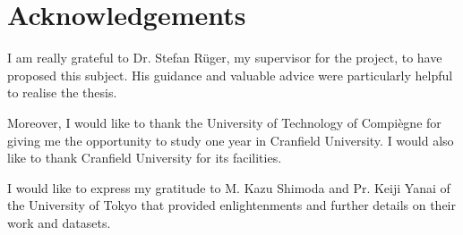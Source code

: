 \chapter{Acknowledgements}

I am really grateful to Dr. Stefan Rüger, my supervisor for the project, to have proposed this subject. His guidance and valuable advice were particularly helpful to realise the thesis.

Moreover, I would like to thank the University of Technology of Compiègne for giving me the opportunity to study one year in Cranfield University. I would also like to thank Cranfield University for its facilities.

I would like to express my gratitude to M. Kazu Shimoda and Pr. Keiji Yanai of the University of Tokyo that provided enlightenments and further details on their work and datasets.